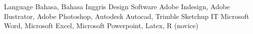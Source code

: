 
\begin{cvskills}
	\cvskill
	{Language}
	{Bahasa, Bahasa Inggris}
	\cvskill
	{Design Software}
	{Adobe Indesign, Adobe Ilustrator, Adobe Photoshop, Autodesk Autocad, Trimble Sketchup}
	\cvskill
	{IT}
	{Microsoft Word, Microsoft Excel, Microsoft Powerpoint, Latex, R (novice) }

\end{cvskills}
